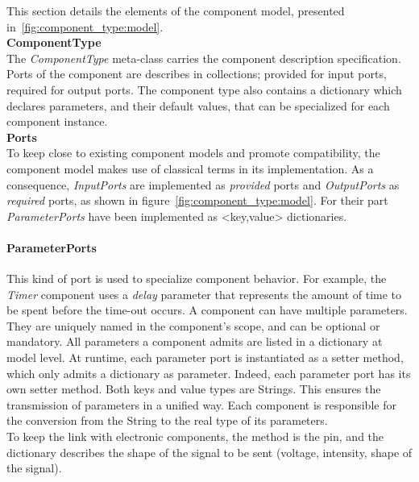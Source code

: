 This section details the elements of the component model, presented in~\ref{fig:component_type:model}.\\

{\bf ComponentType}\\

The {\it ComponentType} meta-class carries the component description specification. Ports of the component are describes in collections; provided for input ports, required for output ports. The component type also contains a dictionary which declares parameters, and their default values, that can be specialized for each component instance.\\

{\bf Ports}\\

To keep close to existing component models and promote compatibility, the component model makes use of classical terms in its implementation. As a consequence, {\it InputPorts} are implemented as {\it provided} ports and {\it OutputPorts} as {\it required} ports, as shown in figure~\ref{fig:component_type:model}. For their part {\it ParameterPorts} have been implemented as <key,value> dictionaries.\\

\paragraph{ParameterPorts}
This kind of port is used to specialize component behavior. For example, the \textit{Timer} component uses a \textit{delay} parameter that represents the amount of time to be spent before the time-out occurs. A component can have multiple parameters. They are uniquely named in the component's scope, and can be optional or mandatory. All parameters a component admits are listed in a dictionary at model level.
At runtime, each parameter port is instantiated as a setter method, which only admits a dictionary as parameter. Indeed, each parameter port has its own setter method. Both keys and value types are Strings. This ensures the transmission of parameters in a unified way. Each component is responsible for the conversion from the String to the real type of its parameters.\\
To keep the link with electronic components, the method is the pin, and the dictionary describes the shape of the signal to be sent (voltage, intensity, shape of the signal).

